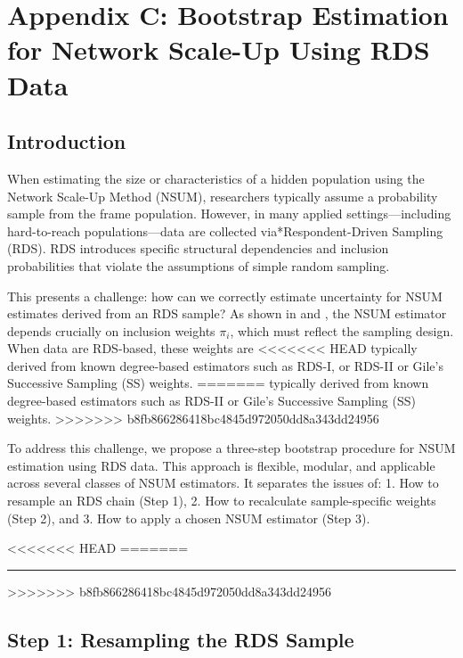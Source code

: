 \documentclass[
  12pt,
  letterpaper,
  DIV=11,
  numbers=noendperiod]{scrartcl}
\theoremstyle{plain}
\theoremstyle{definition}
\begin{document}
{\section{Appendix C: Bootstrap Estimation for Network Scale-Up Using RDS
Data}\label{sec:3step}

\subsection{Introduction}\label{introduction}

When estimating the size or characteristics of a hidden population using
the Network Scale-Up Method (NSUM), researchers typically assume a
probability sample from the frame population. However, in many applied
settings---including hard-to-reach populations---data are collected
via*Respondent-Driven Sampling (RDS). RDS introduces specific structural
dependencies and inclusion probabilities that violate the assumptions of
simple random sampling.

This presents a challenge: how can we correctly estimate uncertainty for
NSUM estimates derived from an RDS sample? As shown in
\textcite{feeh16-generalizing} and \textcite{salg06-variance}, the NSUM
estimator depends crucially on inclusion weights \(\pi_i\), which must
reflect the sampling design. When data are RDS-based, these weights are
<<<<<<< HEAD
typically derived from known degree-based estimators such as RDS-I, or
RDS-II or Gile's Successive Sampling (SS) weights.
=======
typically derived from known degree-based estimators such as RDS-II or
Gile's Successive Sampling (SS) weights.
>>>>>>> b8fb866286418bc4845d972050dd8a343dd24956

To address this challenge, we propose a three-step bootstrap procedure
for NSUM estimation using RDS data. This approach is flexible, modular,
and applicable across several classes of NSUM estimators. It separates
the issues of: 1. How to resample an RDS chain (Step 1), 2. How to
recalculate sample-specific weights (Step 2), and 3. How to apply a
chosen NSUM estimator (Step 3).

<<<<<<< HEAD
=======
\begin{center}\rule{0.5\linewidth}{0.5pt}\end{center}

>>>>>>> b8fb866286418bc4845d972050dd8a343dd24956
\subsection{Step 1: Resampling the RDS
Sample}\label{step-1-resampling-the-rds-sample}

}
\end{document}
